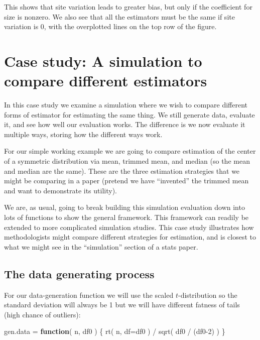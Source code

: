 \documentclass[
]{book}
\newenvironment{Shaded}{\begin{snugshade}}{\end{snugshade}}
\newcommand{\AttributeTok}[1]{\textcolor[rgb]{0.77,0.63,0.00}{#1}}
\newcommand{\ControlFlowTok}[1]{\textcolor[rgb]{0.13,0.29,0.53}{\textbf{#1}}}
\newcommand{\DecValTok}[1]{\textcolor[rgb]{0.00,0.00,0.81}{#1}}
\newcommand{\FunctionTok}[1]{\textcolor[rgb]{0.00,0.00,0.00}{#1}}
\newcommand{\NormalTok}[1]{#1}
\newcommand{\OtherTok}[1]{\textcolor[rgb]{0.56,0.35,0.01}{#1}}
\newcommand{\SpecialCharTok}[1]{\textcolor[rgb]{0.00,0.00,0.00}{#1}}
\begin{document}
This shows that site variation leads to greater bias, but only if the coefficient for size is nonzero.
We also see that all the estimators must be the same if site variation is 0, with the overplotted lines on the top row of the figure.

\hypertarget{case-study-a-simulation-to-compare-different-estimators}{%
\chapter{Case study: A simulation to compare different estimators}\label{case-study-a-simulation-to-compare-different-estimators}}

In this case study we examine a simulation where we wish to compare different forms of
estimator for estimating the same thing. We still generate data, evaluate it,
and see how well our evaluation works. The difference is we now evaluate it
multiple ways, storing how the different ways work.

For our simple working example we are going to compare estimation of the
center of a symmetric distribution via mean, trimmed mean, and median (so the
mean and median are the same). These are the three estimation strategies
that we might be comparing in a paper (pretend we have ``invented'' the trimmed
mean and want to demonstrate its utility).

We are, as usual, going to break building this simulation evaluation down into lots of
functions to show the general framework. This framework can readily be
extended to more complicated simulation studies.
This case study illustrates how methodologists might compare different strategies for estimation, and is
closest to what we might see in the ``simulation'' section of a stats paper.

\hypertarget{the-data-generating-process}{%
\section{The data generating process}\label{the-data-generating-process}}

For our data-generation function we will use the scaled \(t\)-distribution so
the standard deviation will always be 1 but we will have different fatness of
tails (high chance of outliers):

\begin{Shaded}
\begin{Highlighting}[]
\NormalTok{gen.data }\OtherTok{=} \ControlFlowTok{function}\NormalTok{( n, df0 ) \{}
    \FunctionTok{rt}\NormalTok{( n, }\AttributeTok{df=}\NormalTok{df0 ) }\SpecialCharTok{/} \FunctionTok{sqrt}\NormalTok{( df0 }\SpecialCharTok{/}\NormalTok{ (df0}\DecValTok{{-}2}\NormalTok{) )}
\NormalTok{\}}
\end{Highlighting}
\end{Shaded}
\end{document}
